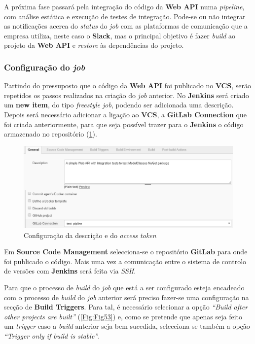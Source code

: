 \hspace{1cm}A próxima fase passará pela integração do código da \textbf{Web API} numa \textit{pipeline}, com análise estática e execução de testes de integração. Pode-se ou não integrar as notificações acerca do \textit{status} do \textit{job} com as plataformas de comunicação que a empresa utiliza, neste caso o \textbf{Slack}, mas o principal objetivo é fazer \textit{build} ao projeto da \textbf{Web API} e \textit{restore} às dependências do projeto.

\subsubsection{Configuração do \textit{job}}

\hspace{1cm}Partindo do pressuposto que o código da \textbf{Web API} foi publicado no \textbf{VCS}, serão repetidos os passos realizados na criação do \textit{job} anterior. No \textbf{Jenkins} será criado um \textbf{new item}, do tipo \textit{freestyle job}, podendo ser adicionada uma descrição. Depois será necessário adicionar a ligação ao \textbf{VCS}, a \textbf{GitLab Connection} que foi criada anteriormente, para que seja possível trazer para o \textbf{Jenkins} o código armazenado no repositório (\ref{Fig:Fig52}).

\begin{figure}[hbt!]
\centering
\includegraphics[width=0.9\linewidth]{Cap5/JenkinsGitLabConnection.png}
\caption{Configuração da descrição e do \textit{access token}}
\label{Fig:Fig52}
\end{figure}

\hspace{1cm}Em \textbf{Source Code Management} selecciona-se o repositório \textbf{GitLab} para onde foi publicado o código. Mais uma vez a comunicação entre o sistema de controlo de versões com \textbf{Jenkins} será feita via \textit{SSH}.

\hspace{1cm}Para que o processo de \textit{build} do \textit{job} que está a ser configurado esteja encadeado com o processo de \textit{build} do \textit{job} anterior será preciso fazer-se uma configuração na secção de \textbf{Build Triggers}. Para tal, é necessário selecionar a opção \textit{``Build after other projects are built''} (\ref{Fig:Fig53}) e, como se pretende que apenas seja feito um \textit{trigger} caso a \textit{build} anterior seja bem sucedida, selecciona-se também a opção \textit{``Trigger only if build is stable''}.

